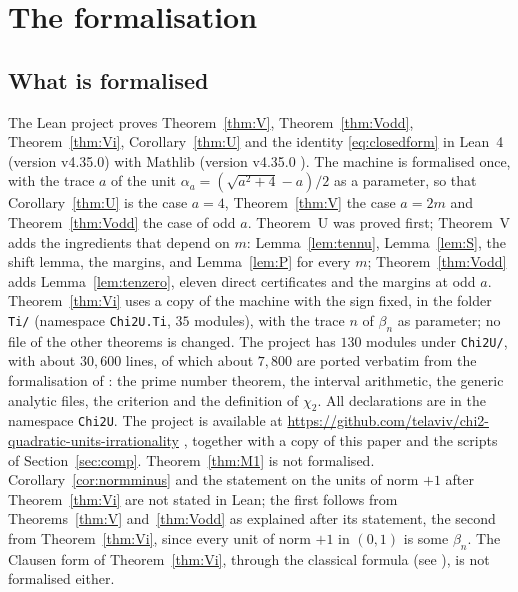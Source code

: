\documentclass[11pt]{amsart}
\theoremstyle{definition}
\theoremstyle{remark}
\numberwithin{equation}{section}
\newcommand{\lean}[1]{{\def\_{\textunderscore\allowbreak}\texttt{#1}}}
\begin{document}
\section{The formalisation}\label{sec:lean}

\subsection{What is formalised}
The Lean project \cite{PiTwoRepo} proves Theorem~\ref{thm:V}, Theorem~\ref{thm:Vodd}, Theorem~\ref{thm:Vi},
Corollary~\ref{thm:U} and the identity \eqref{eq:closedform} in Lean~4 \cite{LeanFour} (version v4.35.0) with Mathlib \cite{Mathlib} (version v4.35.0
\cite{Mathlib4}). The machine is formalised once, with the trace $a$ of the unit $\alpha_a=(\sqrt{a^2+4}-a)/2$ as a
parameter, so that Corollary~\ref{thm:U} is the case $a=4$, Theorem~\ref{thm:V} the case $a=2m$ and
Theorem~\ref{thm:Vodd} the case of odd $a$. Theorem~U was proved first; Theorem~V adds the ingredients that depend on
$m$: Lemma~\ref{lem:tennu}, Lemma~\ref{lem:S}, the shift lemma, the margins, and Lemma~\ref{lem:P} for every $m$;
Theorem~\ref{thm:Vodd} adds Lemma~\ref{lem:tenzero}, eleven direct certificates and the margins at odd $a$.
Theorem~\ref{thm:Vi} uses a copy of the machine with the sign fixed, in the folder \lean{Ti\slash{}} (namespace
\lean{Chi2U.Ti}, $35$ modules), with the trace $n$ of $\beta_n$ as parameter; no file of the other theorems is changed.
The project has $130$ modules under \lean{Chi2U\slash{}}, with about $30{,}600$ lines, of which about $7{,}800$ are ported
verbatim from
the formalisation of \cite{Chi2Paper} \cite{Chi2Repo}: the prime number theorem, the interval arithmetic, the generic
analytic files, the criterion and the definition of $\chi_2$. All declarations are in the namespace \lean{Chi2U}. The
project is available at \url{https://github.com/telaviv/chi2-quadratic-units-irrationality} \cite{PiTwoRepo}, together with
a copy of this paper and the scripts of Section~\ref{sec:comp}. Theorem~\ref{thm:M1} is not formalised.
Corollary~\ref{cor:normminus} and the statement on the units of norm $+1$ after Theorem~\ref{thm:Vi} are not stated in
Lean; the first follows from Theorems~\ref{thm:V} and~\ref{thm:Vodd} as explained after its statement, the second from
Theorem~\ref{thm:Vi}, since every unit of norm $+1$ in $(0,1)$ is some $\beta_n$. The Clausen form of
Theorem~\ref{thm:Vi}, through the classical formula (see \cite{Lewin1981}), is not formalised either.
\end{document}
